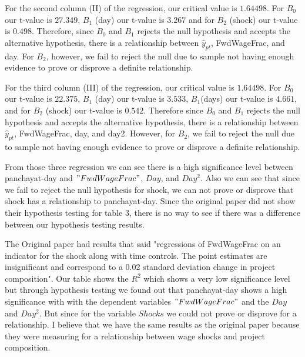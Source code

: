 \documentclass{article}
\begin{document}
For the second column (II) of the regression, our critical value is $1.64498$. For $B_0$ our t-value is $27.349$, $B_1$ (day) our t-value is $3.267$ and for $B_2$ (shock) our t-value is $0.498$. Therefore, since  $B_0$ and $B_1$ rejects the null hypothesis and accepts the alternative hypothesis, there is a relationship between $\hat{y}_{pt}$, FwdWageFrac, and day. For $B_2$, however, we fail to reject the null due to sample not having enough evidence to prove or disprove a definite relationship. 

For the third column (III) of the regression, our critical value is $1.64498$. For $B_0$ our t-value is $22.375$, $B_1$ (day) our t-value is $3.533$, $B_1$(days) our t-value is $4.661$, and for $B_2$ (shock) our t-value is $0.542$. Therefore since $B_0$ and $B_1$ rejects the null hypothesis and accepts the alternative hypothesis, there is a relationship between $\hat{y}_{pt}$, FwdWageFrac, day, and day2. However, for $B_2$, we fail to reject the null due to sample not having enough evidence to prove or disprove a definite relationship. 

From those three regression we can see there is a high significance level between panchayat-day and  $"FwdWageFrac"$, $Day$, and $Day^2$. Also we can see that since we fail to reject the null hypothesis for shock, we can not prove or disprove that shock has a relationship to panchayat-day. Since the original paper did not show their hypothesis testing for table 3, there is no way to see if there was a difference between our hypothesis testing results. 

The Original paper had results that said "regressions of FwdWageFrac on an indicator for the shock along with time controls. The point estimates are insignificant and correspond to a 0.02 standard deviation change in project composition". Our table shows the $R^2$ which shows a very low significance level but through hypothesis testing we found out that panchayat-day shows a high significance with with the dependent variables $"FwdWageFrac"$ and the $Day$ and $Day^2$. But since for the variable $Shocks$ we could not prove or disprove for a relationship.  I believe that we have the same results as the original paper because they were measuring for a relationship between wage shocks and project composition. 
\end{document}
